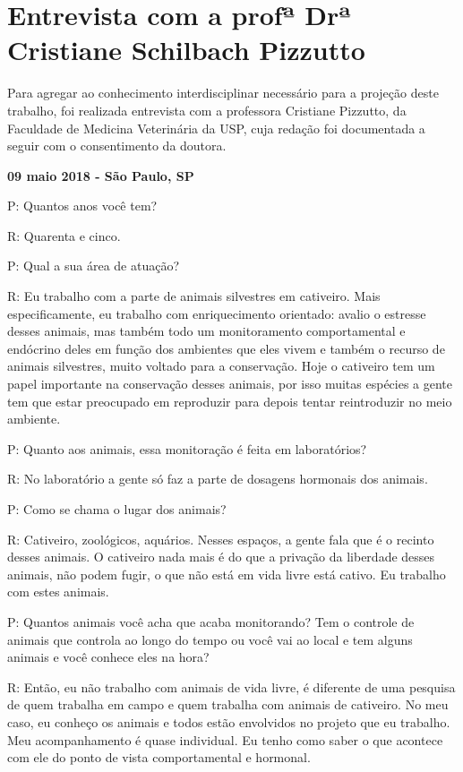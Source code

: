 \chapter{Entrevista com a profª Drª Cristiane Schilbach Pizzutto}

Para agregar ao conhecimento interdisciplinar necessário para a projeção deste trabalho, foi realizada entrevista com a professora Cristiane Pizzutto, da Faculdade de Medicina Veterinária da USP, cuja redação foi documentada a seguir com o consentimento da doutora.

\textbf{09 maio 2018 - São Paulo, SP}

P: Quantos anos você tem?

R: Quarenta e cinco.

P: Qual a sua área de atuação?

R: Eu trabalho com a  parte de animais silvestres em cativeiro. Mais especificamente, eu trabalho com enriquecimento orientado: avalio o estresse desses animais, mas também todo um monitoramento comportamental e endócrino deles em função dos ambientes que eles vivem e também o recurso de animais silvestres, muito voltado para a conservação. Hoje o cativeiro tem um papel importante na conservação desses animais, por isso muitas espécies a gente tem que estar preocupado em reproduzir para depois tentar reintroduzir no meio ambiente.

P: Quanto aos animais, essa monitoração é feita em laboratórios?

R: No laboratório a gente só faz a parte de dosagens hormonais dos animais.


P: Como se chama o lugar dos animais?

R: Cativeiro, zoológicos, aquários. Nesses espaços, a gente fala que é o recinto desses animais. O cativeiro nada mais é do que a privação da liberdade desses animais, não podem fugir, o que não está em vida livre está cativo. Eu trabalho com estes animais.


P: Quantos animais você acha que acaba monitorando? Tem o controle de animais que controla ao longo do tempo ou você vai ao local e tem alguns animais e você conhece eles na hora?

R: Então, eu não trabalho com animais de vida livre, é diferente de uma pesquisa de quem trabalha em campo e quem trabalha com animais de cativeiro. No meu caso, eu conheço os animais e todos estão envolvidos no projeto que eu trabalho. Meu acompanhamento é quase individual. Eu tenho como saber o que acontece com ele do ponto de vista comportamental e hormonal.


